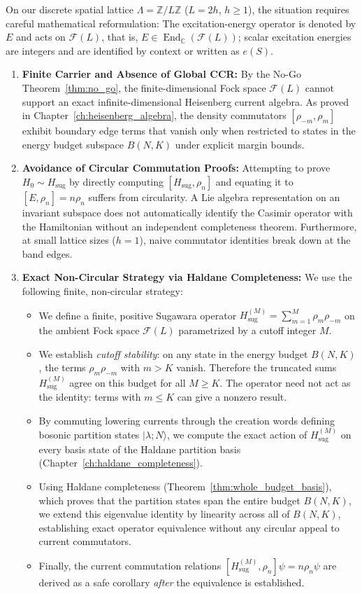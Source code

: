 On our discrete spatial lattice $\Lambda = \mathbb{Z}/L\mathbb{Z}$ ($L = 2h$, $h \ge 1$), the situation requires careful mathematical reformulation: The excitation-energy operator is denoted by $E$ and acts on $\mathcal{F}(L)$, that is, $E\in\operatorname{End}_{\mathbb{C}}(\mathcal{F}(L))$; scalar excitation energies are integers and are identified by context or written as $e(S)$.
\begin{enumerate}
    \item \textbf{Finite Carrier and Absence of Global CCR:} By the No-Go Theorem~\ref{thm:no_go}, the finite-dimensional Fock space $\mathcal{F}(L)$ cannot support an exact infinite-dimensional Heisenberg current algebra. As proved in Chapter~\ref{ch:heisenberg_algebra}, the density commutators $[\rho_{-m}, \rho_m]$ exhibit boundary edge terms that vanish only when restricted to states in the energy budget subspace $B(N, K)$ under explicit margin bounds.
    \item \textbf{Avoidance of Circular Commutation Proofs:} Attempting to prove $H_0 \sim H_{\mathrm{sug}}$ by directly computing $[H_{\mathrm{sug}}, \rho_n]$ and equating it to $[E, \rho_n] = n \rho_n$ suffers from circularity. A Lie algebra representation on an invariant subspace does not automatically identify the Casimir operator with the Hamiltonian without an independent completeness theorem. Furthermore, at small lattice sizes ($h=1$), naive commutator identities break down at the band edges.
    \item \textbf{Exact Non-Circular Strategy via Haldane Completeness:} We use the following finite, non-circular strategy:
    \begin{itemize}
        \item We define a finite, positive Sugawara operator $H_{\mathrm{sug}}^{(M)} = \sum_{m=1}^M \rho_m \rho_{-m}$ on the ambient Fock space $\mathcal{F}(L)$ parametrized by a cutoff integer $M$.
        \item We establish \emph{cutoff stability}: on any state in the energy budget $B(N, K)$, the terms $\rho_m\rho_{-m}$ with $m>K$ vanish. Therefore the truncated sums $H_{\mathrm{sug}}^{(M)}$ agree on this budget for all $M\ge K$. The operator need not act as the identity: terms with $m\le K$ can give a nonzero result.
        \item By commuting lowering currents through the creation words defining bosonic partition states $|\lambda; N\rangle$, we compute the exact action of $H_{\mathrm{sug}}^{(M)}$ on every basis state of the Haldane partition basis (Chapter~\ref{ch:haldane_completeness}).
        \item Using Haldane completeness (Theorem~\ref{thm:whole_budget_basis}), which proves that the partition states span the entire budget $B(N, K)$, we extend this eigenvalue identity by linearity across all of $B(N, K)$, establishing exact operator equivalence without any circular appeal to current commutators.
        \item Finally, the current commutation relations $[H_{\mathrm{sug}}^{(M)}, \rho_n] \psi = n \rho_n \psi$ are derived as a safe corollary \emph{after} the equivalence is established.
    \end{itemize}
\end{enumerate}

